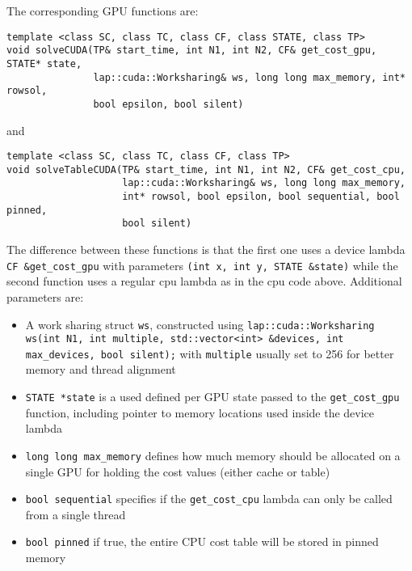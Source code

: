 \documentclass[format=acmsmall,review=false, screen=true]{acmart}
\begin{document}
The corresponding GPU functions are:
\begin{verbatim}
template <class SC, class TC, class CF, class STATE, class TP>
void solveCUDA(TP& start_time, int N1, int N2, CF& get_cost_gpu, STATE* state, 
               lap::cuda::Worksharing& ws, long long max_memory, int* rowsol, 
               bool epsilon, bool silent)
\end{verbatim}
and
\begin{verbatim}
template <class SC, class TC, class CF, class TP>
void solveTableCUDA(TP& start_time, int N1, int N2, CF& get_cost_cpu, 
                    lap::cuda::Worksharing& ws, long long max_memory, 
                    int* rowsol, bool epsilon, bool sequential, bool pinned, 
                    bool silent)
\end{verbatim}
The difference between these functions is that the first one uses a device lambda \texttt{CF \&get\_cost\_gpu} with parameters \texttt{(int x, int y, STATE \&state)} while the second function uses a regular cpu lambda as in the cpu code above.
Additional parameters are:
\begin{itemize}
\item A work sharing struct \texttt{ws}, constructed using \texttt{lap::cuda::Worksharing ws(int N1, int multiple, std::vector<int> \&devices, int max\_devices, bool silent);} with \texttt{multiple} usually set to 256 for better memory and thread alignment
\item \texttt{STATE *state} is a used defined per GPU state passed to the \texttt{get\_cost\_gpu} function, including pointer to memory locations used inside the device lambda
\item \texttt{long long max\_memory} defines how much memory should be allocated on a single GPU for holding the cost values (either cache or table)
\item \texttt{bool sequential} specifies if the \texttt{get\_cost\_cpu} lambda can only be called from a single thread
\item \texttt{bool pinned} if true, the entire CPU cost table will be stored in pinned memory
\end{itemize} 
\end{document}
